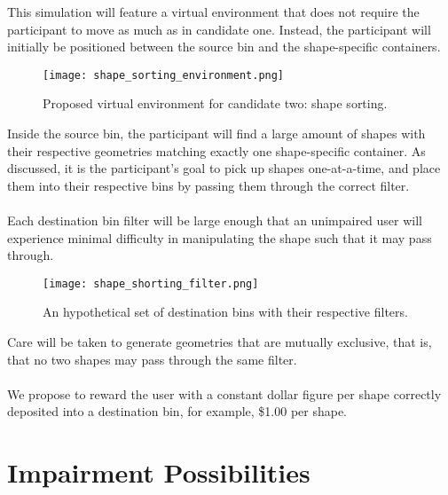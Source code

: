 \documentclass{article}
\begin{document}
This simulation will feature a virtual environment that does not require the participant to move as much as in candidate one. Instead, the participant will initially be positioned between the source bin and the shape-specific containers. 

\begin{figure}[H]
    \texttt{[image: shape\_sorting\_environment.png]}
    \centering
    \caption{Proposed virtual environment for candidate two: shape sorting.}
\end{figure}

Inside the source bin, the participant will find a large amount of shapes with their respective geometries matching exactly one shape-specific container. As discussed, it is the participant's goal to pick up shapes one-at-a-time, and place them into their respective bins by passing them through the correct filter. 
\\
\\
Each destination bin filter will be large enough that an unimpaired user will experience minimal difficulty in manipulating the shape such that it may pass through.

\begin{figure}[H]
    \texttt{[image: shape\_shorting\_filter.png]}
    \centering
    \caption{An hypothetical set of destination bins with their respective filters.}
\end{figure}
\newpage
Care will be taken to generate geometries that are mutually exclusive, that is, that no two shapes may pass through the same filter.
\\
\\
We propose to reward the user with a constant dollar figure per shape correctly deposited into a destination bin, for example, \$1.00 per shape.

\section*{Impairment Possibilities}
\end{document}
